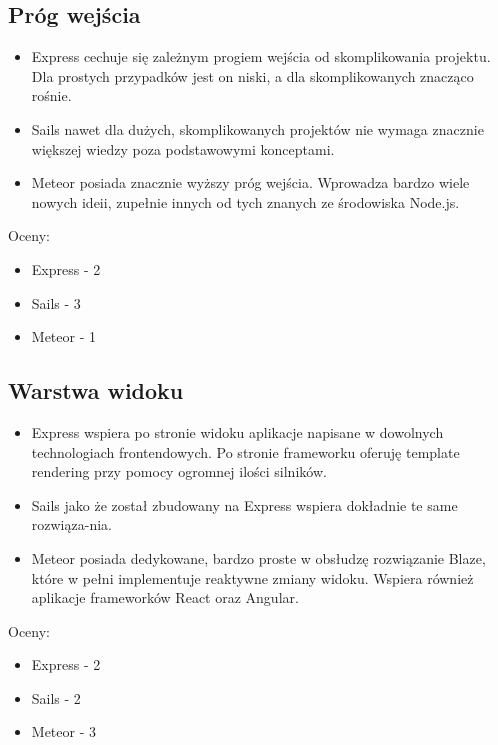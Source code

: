 \documentclass[12pt]{report}
\begin{document}
    \subsection{Próg wejścia}
      \begin{itemize}
        \item Express cechuje się zależnym progiem wejścia od skomplikowania projektu. Dla prostych przypadków jest on niski, a dla skomplikowanych znacząco rośnie.
        \item Sails nawet dla dużych, skomplikowanych projektów nie wymaga znacznie większej wiedzy poza podstawowymi konceptami. 
        \item Meteor posiada znacznie wyższy próg wejścia. Wprowadza bardzo wiele nowych ideii, zupełnie innych od tych znanych ze środowiska Node.js.
      \end{itemize}
      Oceny:
      \begin{itemize}
        \item Express - 2
        \item Sails - 3
        \item Meteor - 1
      \end{itemize}
      
    \subsection{Warstwa widoku}
      \begin{itemize}
        \item Express wspiera po stronie widoku aplikacje napisane w dowolnych technologiach frontendowych. Po stronie frameworku oferuję template rendering przy pomocy ogromnej ilości silników.
        \item Sails jako że został zbudowany na Express wspiera dokładnie te same rozwiąza-nia.
        \item Meteor posiada dedykowane, bardzo proste w obsłudzę rozwiązanie Blaze, które w pełni implementuje reaktywne zmiany widoku. Wspiera również aplikacje frameworków React oraz Angular.
      \end{itemize}
      Oceny:
      \begin{itemize}
        \item Express - 2
        \item Sails - 2
        \item Meteor - 3
      \end{itemize}
      
\end{document}

